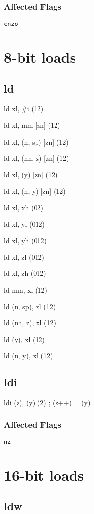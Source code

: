 \documentclass{book}
\begin{document}
\subsubsection*{Affected Flags}

\texttt{cnzo}


\section{8-bit loads}

\subsection{ld}

ld xl, \#i (12)

ld xl, mm [zn] (12)

ld xl, (n, sp) [zn] (12)

ld xl, (nn, z) [zn] (12)

ld xl, (y) [zn] (12)

ld xl, (n, y) [zn] (12)

ld xl, xh (02)

ld xl, yl (012)

ld xl, yh (012)

ld xl, zl (012)

ld xl, zh (012)

ld mm, xl (12)

ld (n, sp), xl (12)

ld (nn, z), xl (12)

ld (y), xl (12)

ld (n, y), xl (12)


\subsection{ldi}

ldi (z), (y) (2)   ; (z++) = (y)

\subsubsection*{Affected Flags}

\texttt{nz}


\section{16-bit loads}

\subsection{ldw}
\end{document}

